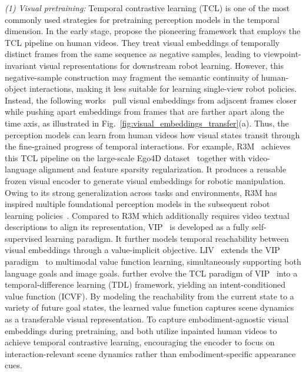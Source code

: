 \documentclass[Afour,sageh,times]{sagej}
\begin{document}
\textit{(1) Visual pretraining:} Temporal contrastive learning (TCL) is one of the most commonly used strategies for pretraining perception models in the temporal dimension. In the early stage, \cite{sermanet2017time} propose the pioneering framework that employs the TCL pipeline on human videos. They treat visual embeddings of temporally distinct frames from the same sequence as negative samples, leading to viewpoint-invariant visual representations for downstream robot learning. However, this negative-sample construction may fragment the semantic continuity of human-object interactions, making it less suitable for learning single-view robot policies. Instead, the following works~\citep{nair2022r3m,ma2022vip,ma2023liv} pull visual embeddings from adjacent frames closer while pushing apart embeddings from frames that are farther apart along the time axis, as illustrated in Fig.~\ref{fig:visual_embeddings_transfer}(a). Thus, the perception models can learn from human videos how visual states transit through the fine-grained progress of temporal interactions. For example, R3M~\citep{nair2022r3m} achieves this TCL pipeline on the large-scale Ego4D dataset~\citep{grauman2022ego4d} together with video-language alignment and feature sparsity regularization. It produces a reusable frozen visual encoder to generate visual embeddings for robotic manipulation. Owing to its strong generalization across tasks and environments, R3M has inspired multiple foundational perception models in the subsequent robot learning policies~\citep{shaw2023videodex,mendonca2023structured,li2024ag2manip,xiong2025ag2x2}. Compared to R3M which additionally requires video textual descriptions to align its representation, VIP~\citep{ma2022vip} is developed as a fully self-supervised learning paradigm. It further models temporal reachability between visual embeddings through a value-implicit objective. LIV~\citep{ma2023liv} extends the VIP paradigm~\citep{ma2022vip} to multimodal value function learning, simultaneously supporting both language goals and image goals. 
\cite{bhateja2023robotic} further evolve the TCL paradigm of VIP~\citep{ma2022vip} into a temporal-difference learning (TDL) framework, yielding an intent-conditioned value function (ICVF). By modeling the reachability from the current state to a variety of future goal states, the learned value function captures scene dynamics as a transferable visual representation. To capture embodiment-agnostic visual embeddings during pretraining, \cite{li2024ag2manip} and \cite{xiong2025ag2x2} both utilize inpainted human videos to achieve temporal contrastive learning, encouraging the encoder to focus on interaction-relevant scene dynamics rather than embodiment-specific appearance cues.
\end{document}
